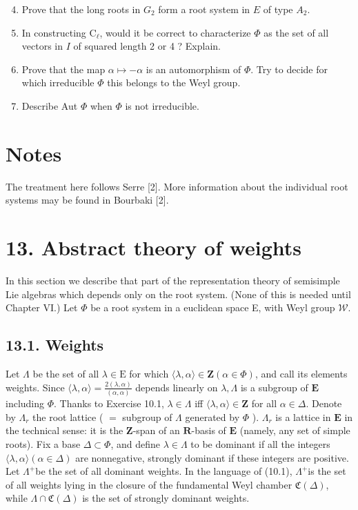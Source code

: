 \documentclass[10pt]{article}
\begin{document}
\begin{enumerate}
  \setcounter{enumi}{3}
  \item Prove that the long roots in $G_{2}$ form a root system in $E$ of type $A_{2}$.
  \item In constructing $\mathrm{C}_{\ell}$, would it be correct to characterize $\Phi$ as the set of all vectors in $I$ of squared length 2 or 4 ? Explain.
  \item Prove that the map $\alpha \mapsto-\alpha$ is an automorphism of $\Phi$. Try to decide for which irreducible $\Phi$ this belongs to the Weyl group.
  \item Describe Aut $\Phi$ when $\Phi$ is not irreducible.
\end{enumerate}

\section*{Notes}
The treatment here follows Serre [2]. More information about the individual root systems may be found in Bourbaki [2].

\section*{13. Abstract theory of weights}
In this section we describe that part of the representation theory of semisimple Lie algebras which depends only on the root system. (None of this is needed until Chapter VI.) Let $\Phi$ be a root system in a euclidean space E, with Weyl group $\mathscr{W}$.

\subsection*{13.1. Weights}
Let $\Lambda$ be the set of all $\lambda \in \mathrm{E}$ for which $\langle\lambda, \alpha\rangle \in \mathbf{Z}(\alpha \in \Phi)$, and call its elements weights. Since $\langle\lambda, \alpha\rangle=\frac{2(\lambda, \alpha)}{(\alpha, \alpha)}$ depends linearly on $\lambda, \Lambda$ is a subgroup of $\mathbf{E}$ including $\Phi$. Thanks to Exercise 10.1, $\lambda \in \Lambda$ iff $\langle\lambda, \alpha\rangle \in \mathbf{Z}$ for all $\alpha \in \Delta$. Denote by $\Lambda_{r}$ the root lattice ( $=$ subgroup of $\Lambda$ generated by $\Phi$ ). $\Lambda_{r}$ is a lattice in $\mathbf{E}$ in the technical sense: it is the $\mathbf{Z}$-span of an $\mathbf{R}$-basis of $\mathbf{E}$ (namely, any set of simple roots). Fix a base $\Delta \subset \Phi$, and define $\lambda \in \Lambda$ to be dominant if all the integers $\langle\lambda, \alpha\rangle(\alpha \in \Delta)$ are nonnegative, strongly dominant if these integers are positive. Let $\Lambda^{+}$be the set of all dominant weights. In the language of (10.1), $\Lambda^{+}$is the set of all weights lying in the closure of the fundamental Weyl chamber $\mathfrak{C}(\Delta)$, while $\Lambda \cap \mathfrak{C}(\Delta)$ is the set of strongly dominant weights.
\end{document}
